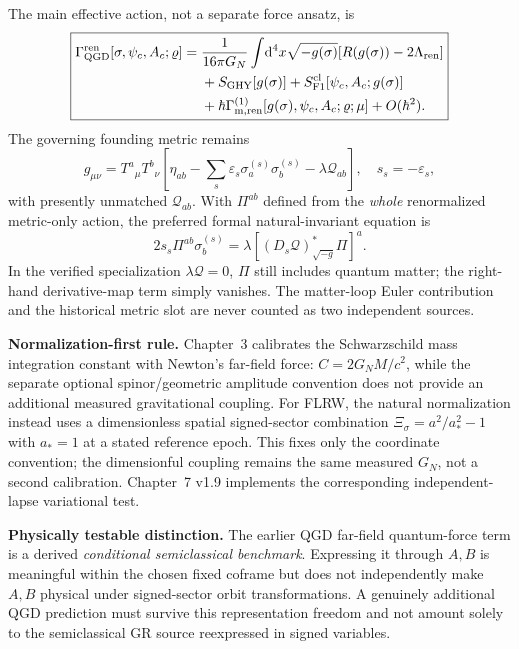 \documentclass[11pt,a4paper]{article}
\theoremstyle{remark}\newtheorem{remark}[theorem]{Remark}
\newcommand{\dd}{\mathrm d}\newcommand{\Tr}{\operatorname{Tr}}\newcommand{\cO}{\mathcal O}\newcommand{\cG}{\mathcal G}\newcommand{\cH}{\mathcal H}\newcommand{\cE}{\mathcal E}\newcommand{\cK}{\mathcal K}\newcommand{\AX}{\textsf{[AXIOM]}}\newcommand{\D}{\textsf{[DERIVED]}}\newcommand{\C}{\textsf{[CONDITIONAL]}}\newcommand{\OPEN}{\textsf{[OPEN]}}
\begin{document}
The main effective action, not a separate force ansatz, is
\begin{equation}\label{eq:v37-main-action}
\boxed{\begin{aligned}
\Gamma^{\rm ren}_{\rm QGD}[\sigma,\psi_c,A_c;\varrho]
={}&\frac1{16\pi G_N}\int\!\dd^4x\sqrt{-g(\sigma)}[R(g(\sigma))-2\Lambda_{\rm ren}]\\
&+S_{\rm GHY}[g(\sigma)]+S_{\rm F1}^{\rm cl}[\psi_c,A_c;g(\sigma)]\\
&+\hbar\Gamma_{\rm m,ren}^{(1)}[g(\sigma),\psi_c,A_c;\varrho;\mu]+O(\hbar^2).
\end{aligned}}
\end{equation}
The governing founding metric remains
\begin{equation}\label{eq:v37-full-map}
\boxed{g_{\mu\nu}=T^a{}_{\mu}T^b{}_{\nu}\!\left[\eta_{ab}-\sum_s\varepsilon_s\sigma_a^{(s)}\sigma_b^{(s)}-\lambda\mathcal Q_{ab}\right],\quad s_s=-\varepsilon_s,}
\end{equation}
with presently unmatched $\mathcal Q_{ab}$. With $\Pi^{ab}$ defined from the \emph{whole} renormalized metric-only action, the preferred formal natural-invariant equation is
\begin{equation}\label{eq:v37-optionc}
\boxed{2s_s\Pi^{ab}\sigma_b^{(s)}=\lambda[(D_s\mathcal Q)^*_{\sqrt{-g}}\Pi]^a.}
\end{equation}
In the verified specialization $\lambda\mathcal Q=0$, $\Pi$ still includes quantum matter; the right-hand derivative-map term simply vanishes. The matter-loop Euler contribution and the historical metric slot are never counted as two independent sources.

\textbf{Normalization-first rule.} Chapter~3 calibrates the Schwarzschild mass integration constant with Newton's far-field force: $C=2G_NM/c^2$, while the separate optional spinor/geometric amplitude convention does not provide an additional measured gravitational coupling. For FLRW, the natural normalization instead uses a dimensionless spatial signed-sector combination $\Xi_\sigma=a^2/a_*^2-1$ with $a_*=1$ at a stated reference epoch. This fixes only the coordinate convention; the dimensionful coupling remains the same measured $G_N$, not a second calibration. Chapter~7 v1.9 implements the corresponding independent-lapse variational test.

\textbf{Physically testable distinction.} The earlier QGD far-field quantum-force term is a derived \emph{conditional semiclassical benchmark}. Expressing it through $A,B$ is meaningful within the chosen fixed coframe but does not independently make $A,B$ physical under signed-sector orbit transformations. A genuinely additional QGD prediction must survive this representation freedom and not amount solely to the semiclassical GR source reexpressed in signed variables.


\clearpage
\end{document}

